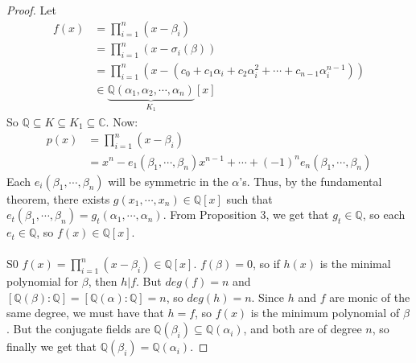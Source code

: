 \documentclass{article}
\newcommand{\C}{\mathbb{C}}
\newcommand{\Q}{\mathbb{Q}}
\begin{document}
\begin{proof}
Let
\begin{align*}
    f(x)&=\displaystyle\prod_{i=1}^n(x-\beta_i)\\
    &=\prod_{i=1}^n(x-\sigma_i(\beta))\\
    &=\prod_{i=1}^n(x-(c_0+c_1\alpha_i+c_2\alpha_i^2+\cdots +c_{n-1}\alpha_i^{n-1}))\\
    &\in \underbrace{\Q(\alpha_1,\alpha_2,\cdots,\alpha_n)}_{K_1}[x]
\end{align*}
So $\Q\subseteq K\subseteq K_1\subseteq \C$. Now:
\begin{align*}
    p(x)&=\displaystyle\prod_{i=1}^n(x-\beta_i)\\
    &=x^n-e_1(\beta_1,\cdots, \beta_n)x^{n-1}+\cdots + (-1)^ne_n(\beta_1,\cdots, \beta_n)
\end{align*}
Each $e_i(\beta_1,\cdots, \beta_n)$ will be symmetric in the $\alpha$'s. Thus, by the fundamental theorem, there exists $g(x_1,\cdots, x_n)\in\Q[x]$ such that $e_t(\beta_1,\cdots, \beta_n)= g_t(\alpha_1,\cdots, \alpha_n)$. From Proposition 3, we get that $g_t\in\Q$, so each $e_t\in\Q$, so $f(x)\in\Q[x]$.\\
\\
S0 $f(x)=\displaystyle\prod_{i=1}^n (x-\beta_i)\in \Q[x]$. $f(\beta)=0$, so if $h(x)$ is the minimal polynomial for $\beta$, then $h|f$. But $deg(f)=n$ and $[\Q(\beta):\Q]=[\Q(\alpha):\Q]=n$, so $deg(h)=n$. Since $h$ and $f$ are monic of the same degree, we must have that $h=f$, so $f(x)$ is the minimum polynomial of $\beta$. But the conjugate fields are $\Q(\beta_i)\subseteq \Q(\alpha_i)$, and both are of degree $n$, so finally we get that $\Q(\beta_i)=\Q(\alpha_i)$.
\end{proof}
\newpage
\end{document}
